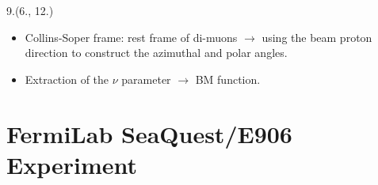 \documentclass[12pt, xcolor={dvipsnames}, aspectratio = 169, sans, mathserif]{beamer}
\newenvironment{List}[2]
{\begin{textblock}{#1}#2
\begin{itemize}}
{\end{itemize}
\end{textblock}}
\begin{document}
\begin{frame}
\begin{List}{9.}{(6., 12.)}

  \item Collins-Soper frame: rest frame of di-muons $\rightarrow$ using the beam proton direction to construct the azimuthal and polar angles.

  \item Extraction of the $\nu$ parameter $\rightarrow$ BM function.

\end{List}
\end{frame}

\section{FermiLab SeaQuest/E906 Experiment}
\end{document}
